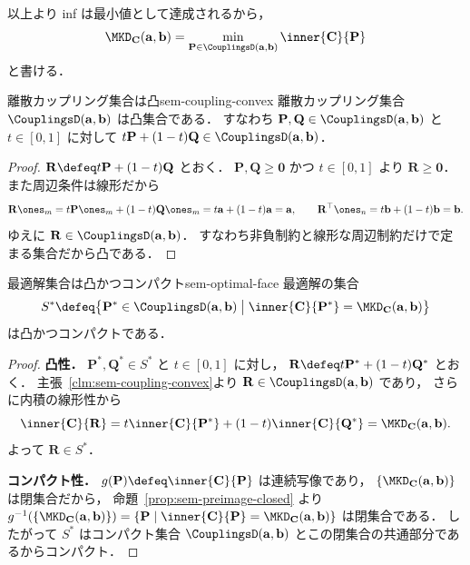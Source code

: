 以上より inf は最小値として達成されるから，
\[
  \MKD_{\mathbf{C}}(\mathbf{a}, \mathbf{b})
  = \min_{\mathbf{P} \in \CouplingsD(\mathbf{a}, \mathbf{b})} \inner{\mathbf{C}}{\mathbf{P}}
\]
と書ける．

\begin{claim}{離散カップリング集合は凸}{sem-coupling-convex}
  離散カップリング集合 $\CouplingsD(\mathbf{a}, \mathbf{b})$ は凸集合である．
  すなわち $\mathbf{P}, \mathbf{Q} \in \CouplingsD(\mathbf{a}, \mathbf{b})$ と
  $t \in [0,1]$ に対して
  $t\mathbf{P} + (1-t)\mathbf{Q} \in \CouplingsD(\mathbf{a}, \mathbf{b})$．
\end{claim}

\begin{proof}
  $\mathbf{R} \defeq t\mathbf{P} + (1-t)\mathbf{Q}$ とおく．
  $\mathbf{P}, \mathbf{Q} \geq \mathbf{0}$ かつ $t \in [0,1]$ より $\mathbf{R} \geq \mathbf{0}$．
  また周辺条件は線形だから
  \[
    \mathbf{R}\ones_m
    = t\mathbf{P}\ones_m + (1-t)\mathbf{Q}\ones_m
    = t\mathbf{a} + (1-t)\mathbf{a} = \mathbf{a},
    \qquad
    \mathbf{R}^\top\ones_n
    = t\mathbf{b} + (1-t)\mathbf{b} = \mathbf{b}.
  \]
  ゆえに $\mathbf{R} \in \CouplingsD(\mathbf{a}, \mathbf{b})$．
  すなわち非負制約と線形な周辺制約だけで定まる集合だから凸である．
\end{proof}

\begin{claim}{最適解集合は凸かつコンパクト}{sem-optimal-face}
  最適解の集合
  \[
    S^*
    \defeq
    \bigl\{ \mathbf{P}^* \in \CouplingsD(\mathbf{a}, \mathbf{b})
    \bigm|
    \inner{\mathbf{C}}{\mathbf{P}^*} = \MKD_{\mathbf{C}}(\mathbf{a}, \mathbf{b})
    \bigr\}
  \]
  は凸かつコンパクトである．
\end{claim}

\begin{proof}
  \textbf{凸性．}
  $\mathbf{P}^*, \mathbf{Q}^* \in S^*$ と $t \in [0,1]$ に対し，
  $\mathbf{R} \defeq t\mathbf{P}^* + (1-t)\mathbf{Q}^*$ とおく．
  主張~\ref{clm:sem-coupling-convex}より $\mathbf{R} \in \CouplingsD(\mathbf{a}, \mathbf{b})$ であり，
  さらに内積の線形性から
  \[
    \inner{\mathbf{C}}{\mathbf{R}}
    = t\inner{\mathbf{C}}{\mathbf{P}^*} + (1-t)\inner{\mathbf{C}}{\mathbf{Q}^*}
    = \MKD_{\mathbf{C}}(\mathbf{a}, \mathbf{b}).
  \]
  よって $\mathbf{R} \in S^*$．

  \textbf{コンパクト性．}
  $g(\mathbf{P}) \defeq \inner{\mathbf{C}}{\mathbf{P}}$ は連続写像であり，
  $\{\MKD_{\mathbf{C}}(\mathbf{a},\mathbf{b})\}$ は閉集合だから，
  命題~\ref{prop:sem-preimage-closed} より
  $g^{-1}(\{\MKD_{\mathbf{C}}(\mathbf{a},\mathbf{b})\}) = \{\mathbf{P} \mid \inner{\mathbf{C}}{\mathbf{P}} = \MKD_{\mathbf{C}}(\mathbf{a},\mathbf{b})\}$
  は閉集合である．
  したがって $S^*$ はコンパクト集合 $\CouplingsD(\mathbf{a},\mathbf{b})$ とこの閉集合の共通部分であるからコンパクト．
\end{proof}

